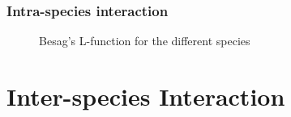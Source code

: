 \documentclass[t]{beamer}
\begin{document}
\begin{frame}
	\frametitle{Intra-species interaction}
	\vskip -55pt
\begin{figure}[htb]
	  \centering
  \caption{Besag's L-function for the different species}
  \label{fig:intra_interactions}
\end{figure}
\end{frame}


\section{Inter-species Interaction}
\end{document}
